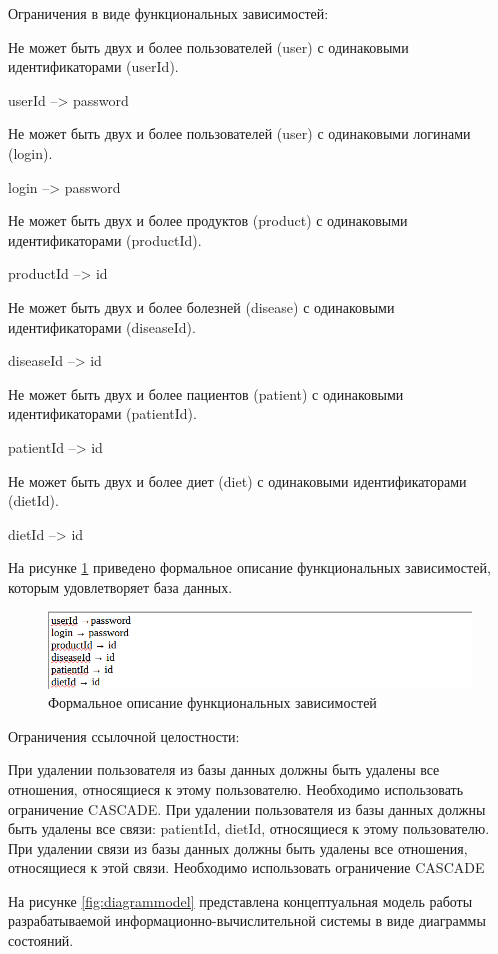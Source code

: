 Ограничения в виде функциональных зависимостей: 

Не может быть двух и более пользователей (user) с одинаковыми идентификаторами (userId).

userId --> password

Не может быть двух и более пользователей (user) с одинаковыми логинами (login).

login --> password

Не может быть двух и более продуктов (product) с одинаковыми идентификаторами (productId).

productId --> id

Не может быть двух и более болезней (disease) с одинаковыми идентификаторами (diseaseId).

diseaseId --> id

Не может быть двух и более пациентов (patient) с одинаковыми идентификаторами (patientId).

patientId --> id

Не может быть двух и более диет (diet) с одинаковыми идентификаторами (dietId).

dietId --> id

На рисунке \ref{fig:imagefn} приведено формальное описание функциональных зависимостей, которым удовлетворяет база данных.

\begin{figure}[H]
	\centering
	\includegraphics[width=0.7\linewidth]{"images/Формальное описание функциональных зависимостей"}
	\caption{Формальное описание функциональных зависимостей}
	\label{fig:imagefn}
\end{figure}

Ограничения ссылочной целостности:

При удалении пользователя из базы данных должны быть удалены все отношения, относящиеся к этому пользователю. Необходимо использовать ограничение CASCADE. При удалении пользователя из базы данных должны быть удалены все связи: patientId, dietId, относящиеся к этому пользователю. При удалении связи из базы данных должны быть удалены все отношения, относящиеся к этой связи. Необходимо использовать ограничение CASCADE

На рисунке \ref{fig:diagrammodel} представлена концептуальная модель работы разрабатываемой информационно-вычислительной системы в виде диаграммы состояний.

